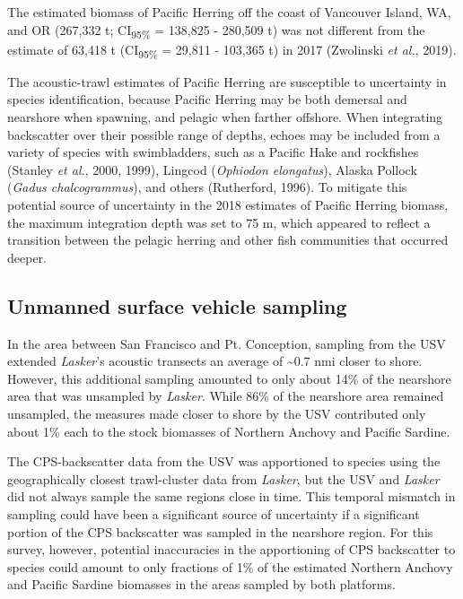\documentclass[]{article}
\begin{document}
The estimated biomass of Pacific Herring off the coast of Vancouver Island, WA, and OR (267,332 t; CI\textsubscript{95\%} = 138,825 - 280,509 t) was not different from the estimate of 63,418 t (CI\textsubscript{95\%} = 29,811 - 103,365 t) in 2017 (Zwolinski \emph{et al.}, 2019).

The acoustic-trawl estimates of Pacific Herring are susceptible to uncertainty in species identification, because Pacific Herring may be both demersal and nearshore when spawning, and pelagic when farther offshore. When integrating backscatter over their possible range of depths, echoes may be included from a variety of species with swimbladders, such as a Pacific Hake and rockfishes (Stanley \emph{et al.}, 2000, 1999), Lingcod (\emph{Ophiodon elongatus}), Alaska Pollock (\emph{Gadus chalcogrammus}), and others (Rutherford, 1996). To mitigate this potential source of uncertainty in the 2018 estimates of Pacific Herring biomass, the maximum integration depth was set to 75 m, which appeared to reflect a transition between the pelagic herring and other fish communities that occurred deeper.

\hypertarget{unmanned-surface-vehicle-sampling}{%
\subsection{Unmanned surface vehicle sampling}\label{unmanned-surface-vehicle-sampling}}

In the area between San Francisco and Pt. Conception, sampling from the USV extended \emph{Lasker}'s acoustic transects an average of \textasciitilde0.7 nmi closer to shore. However, this additional sampling amounted to only about 14\% of the nearshore area that was unsampled by \emph{Lasker}. While 86\% of the nearshore area remained unsampled, the measures made closer to shore by the USV contributed only about 1\% each to the stock biomasses of Northern Anchovy and Pacific Sardine.

The CPS-backscatter data from the USV was apportioned to species using the geographically closest trawl-cluster data from \emph{Lasker}, but the USV and \emph{Lasker} did not always sample the same regions close in time. This temporal mismatch in sampling could have been a significant source of uncertainty if a significant portion of the CPS backscatter was sampled in the nearshore region. For this survey, however, potential inaccuracies in the apportioning of CPS backscatter to species could amount to only fractions of 1\% of the estimated Northern Anchovy and Pacific Sardine biomasses in the areas sampled by both platforms.
\end{document}
